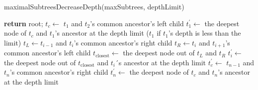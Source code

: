 \documentclass{report}
\begin{document}
\begin{algorithm}[H]
\caption{maximalSubtreesDecreaseDepth(maxSubtrees, depthLimit)}
\label{maximalSubtreesDecreaseDepth}


{
	\textbf{return} root;
}
\Else
{
	$t_c \leftarrow$ $t_1$ and $t_2$'s common ancestor's left child\;
	$t_1^\prime \leftarrow$ the deepest node of $t_c$ and $t_1$'s ancestor at the depth limit ($t_1$ if $t_1$'s depth is less than the limit)\;
	{
		$t_L \leftarrow t_{i-1}$ and $t_{i}$'s common ancestor's right child\;
		$t_R \leftarrow t_{i}$ and $t_{i+1}$'s common ancestor's left child\;
		$t_{\text{closest}} \leftarrow $ the deepest node out of $t_L$ and $t_R$\;
		$t_i^\prime \leftarrow$ the deepest node out of $t_{\text{closest}}$ and $t_i$´s ancestor at the depth limit\;
	}
	$t_c^\prime \leftarrow$ $t_{n-1}$ and $t_n$'s common ancestor's right child \;
	$t_n^\prime \leftarrow$ the deepest node of $t_c$ and $t_n$'s ancestor at the depth limit\;
}

\end{algorithm}
\end{document}
